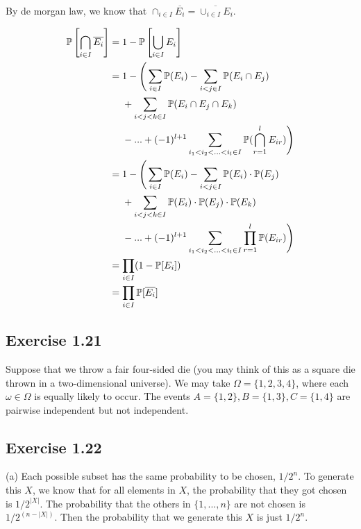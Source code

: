 By de morgan law, we know that $\cap_{i \in I} \overline{E_i} = \overline{\cup_{i \in I} E_i}$.

\begin{equation*}
\begin{split}
\P\left[\bigcap_{i\in I}\overline{E_i} \right] & = 1 - \P\left[\bigcup_{i \in I} E_i \right] \\
& = 1 - \Bigg( \sum_{i\in I} \P(E_i) - \sum_{i<j \in I} \P(E_i \cap E_j) \\
& \ \ \ \ + \sum_{i<j<k \in I} \P(E_i \cap E_j \cap E_k) \\
& \ \ \ \ - ... + (-1)^{l+1} \sum_{i_1 < i_2 < ... < i_l \in I} \P( \bigcap_{r=1}^{l} E_{ir}) \Bigg) \\
& = 1 - \Bigg( \sum_{i\in I} \P(E_i) - \sum_{i<j \in I} \P(E_i) \cdot \P(E_j) \\
& \ \ \ \ + \sum_{i<j<k \in I} \P(E_i) \cdot \P(E_j) \cdot \P(E_k) \\
& \ \ \ \ - ... + (-1)^{l+1} \sum_{i_1 < i_2 < ... < i_l \in I} \prod_{r=1}^{l}\P ( E_{ir} ) \Bigg) \\
& = \prod_{i \in I}(1 - \P[E_i])\\
& = \prod_{i\in I}\P[\overline{E_i}] \\ 
\end{split}
\end{equation*}

\subsection*{Exercise 1.21}

Suppose that we throw a fair four-sided die (you may think of this as a square
die thrown in a two-dimensional universe). We may take $\Omega = \{1, 2,3,4\}$, where each $\omega \in \Omega$
is equally likely to occur. The events $A = \{1, 2\}, B = \{1, 3\}, C = \{1,4\}$ are pairwise
independent but not independent.

\subsection*{Exercise 1.22}

\noindent (a) Each possible subset has the same probability to be chosen, $1/2^n$. To generate this $X$,
we know that for all elements in $X$, the probability that they got chosen is $1/2^{|X|}$. The probability
that the others in $\{1,...,n\}$ are not chosen is $1/2^{(n-|X|)}$. Then the probability that we generate
this $X$ is just $1/2^{n}$.

